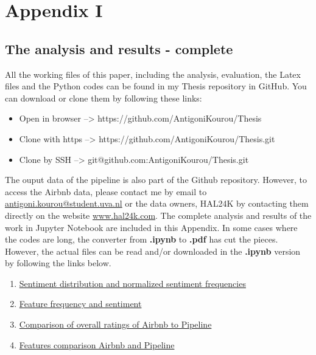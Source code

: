 %
%
\large
\chapter{Appendix I}
\label{app:app01}
\section{The analysis and results - complete}
All the working files of this paper, including the analysis, evaluation, the Latex files and the Python codes can be found in my Thesis repository in GitHub. You can download or clone them by following these links:

\begin{itemize}
\item Open in browser --> https://github.com/AntigoniKourou/Thesis
\item Clone with https --> https://github.com/AntigoniKourou/Thesis.git
\item Clone by SSH --> git@github.com:AntigoniKourou/Thesis.git
\end{itemize}
The ouput data of the pipeline is also part of the Github repository. However, to access the Airbnb data, please contact me by email to \href{mailto:antigoni.kourou@student.uva.nl}{antigoni.kourou@student.uva.nl} or the data owners, HAL24K by contacting them directly on the website \href{http://hal24k.com/} {www.hal24k.com}. The complete analysis and results of the work in Jupyter Notebook are included in this Appendix. In some cases where the codes are long, the converter from \textbf{.ipynb} to \textbf{.pdf} has cut the pieces. However, the actual files can be read and/or downloaded in the \textbf{.ipynb} version by following the links below.

\begin{enumerate}

\item \href{https://github.com/AntigoniKourou/Thesis/blob/162bfcf814ff96f8729bd033a7eb9813e89ca454/Sentiment\%20distribution\%20and\%20normalized\%20sentiment\%20frequencies\%20.ipynb}{Sentiment distribution and normalized sentiment frequencies}

\item \href{https://github.com/AntigoniKourou/Thesis/blob/162bfcf814ff96f8729bd033a7eb9813e89ca454/Feature frequency and sentiment.ipynb}{Feature frequency and sentiment}

\item \href{https://github.com/AntigoniKourou/Thesis/blob/162bfcf814ff96f8729bd033a7eb9813e89ca454/Comparison\%20of\%20overall\%20ratings\%20of\%20Airbnb\%20to\%20Pipeline.ipynb}{Comparison of overall ratings of Airbnb to Pipeline} 

\item \href{https://github.com/AntigoniKourou/Thesis/blob/162bfcf814ff96f8729bd033a7eb9813e89ca454/Features\%20comparison\%20Airbnb\%20and\%20Pipeline.ipynb}{Features comparison Airbnb and Pipeline}

\end{enumerate}




